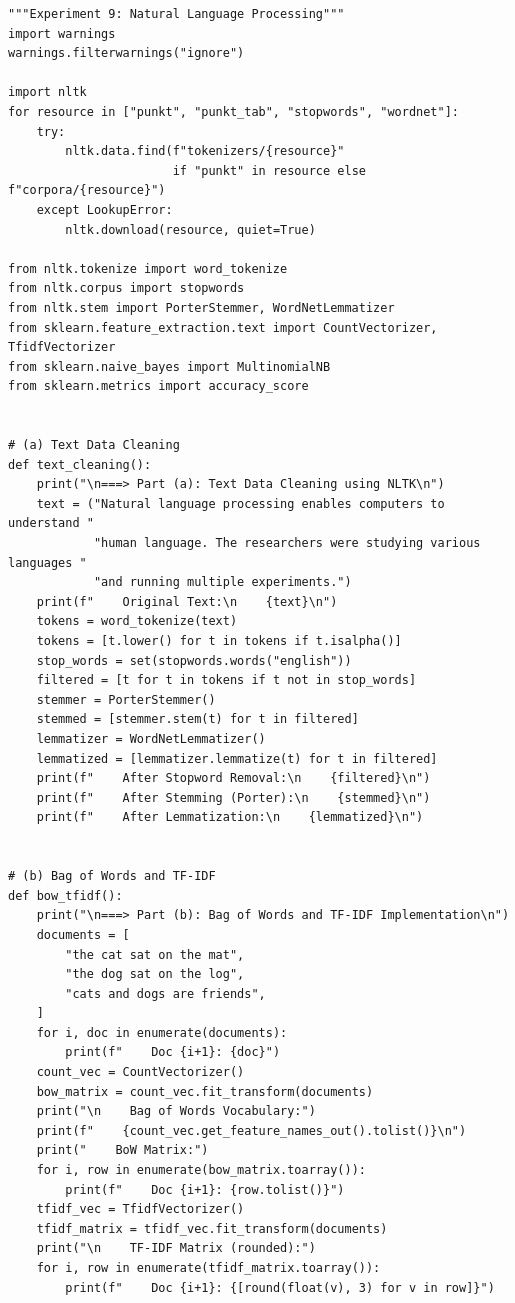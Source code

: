 \documentclass[12pt,a4paper]{article}
\begin{document}
\begin{lstlisting}
"""Experiment 9: Natural Language Processing"""
import warnings
warnings.filterwarnings("ignore")

import nltk
for resource in ["punkt", "punkt_tab", "stopwords", "wordnet"]:
    try:
        nltk.data.find(f"tokenizers/{resource}"
                       if "punkt" in resource else f"corpora/{resource}")
    except LookupError:
        nltk.download(resource, quiet=True)

from nltk.tokenize import word_tokenize
from nltk.corpus import stopwords
from nltk.stem import PorterStemmer, WordNetLemmatizer
from sklearn.feature_extraction.text import CountVectorizer, TfidfVectorizer
from sklearn.naive_bayes import MultinomialNB
from sklearn.metrics import accuracy_score


# (a) Text Data Cleaning
def text_cleaning():
    print("\n===> Part (a): Text Data Cleaning using NLTK\n")
    text = ("Natural language processing enables computers to understand "
            "human language. The researchers were studying various languages "
            "and running multiple experiments.")
    print(f"    Original Text:\n    {text}\n")
    tokens = word_tokenize(text)
    tokens = [t.lower() for t in tokens if t.isalpha()]
    stop_words = set(stopwords.words("english"))
    filtered = [t for t in tokens if t not in stop_words]
    stemmer = PorterStemmer()
    stemmed = [stemmer.stem(t) for t in filtered]
    lemmatizer = WordNetLemmatizer()
    lemmatized = [lemmatizer.lemmatize(t) for t in filtered]
    print(f"    After Stopword Removal:\n    {filtered}\n")
    print(f"    After Stemming (Porter):\n    {stemmed}\n")
    print(f"    After Lemmatization:\n    {lemmatized}\n")


# (b) Bag of Words and TF-IDF
def bow_tfidf():
    print("\n===> Part (b): Bag of Words and TF-IDF Implementation\n")
    documents = [
        "the cat sat on the mat",
        "the dog sat on the log",
        "cats and dogs are friends",
    ]
    for i, doc in enumerate(documents):
        print(f"    Doc {i+1}: {doc}")
    count_vec = CountVectorizer()
    bow_matrix = count_vec.fit_transform(documents)
    print("\n    Bag of Words Vocabulary:")
    print(f"    {count_vec.get_feature_names_out().tolist()}\n")
    print("    BoW Matrix:")
    for i, row in enumerate(bow_matrix.toarray()):
        print(f"    Doc {i+1}: {row.tolist()}")
    tfidf_vec = TfidfVectorizer()
    tfidf_matrix = tfidf_vec.fit_transform(documents)
    print("\n    TF-IDF Matrix (rounded):")
    for i, row in enumerate(tfidf_matrix.toarray()):
        print(f"    Doc {i+1}: {[round(float(v), 3) for v in row]}")



\end{lstlisting}
\end{document}
